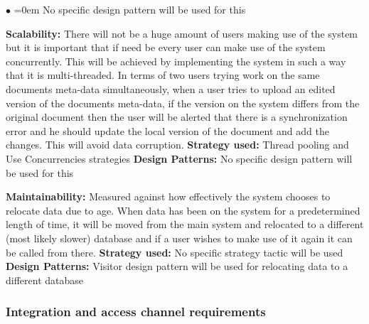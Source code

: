 \documentclass[english]{article}
\begin{document}
\begin{list}{$\bullet$}{\leftmargin=1.5cm \itemindent=0em}
					\newline No specific design pattern will be used for this				
					\item \textbf{Scalability:} There will not be a huge amount of users making use of the system but it is important that if need be every user can make use of the system concurrently. This will be achieved by implementing the system in such a way that it is multi-threaded. In terms of two users trying work on the same documents meta-data simultaneously, when a user tries to upload an edited version of the documents meta-data, if the version on the system differs from the original document then the user will be alerted that there is a synchronization error and he should update the local version of the document and add the changes. This will avoid data corruption.
					\newline \textbf{Strategy used:}
					\newline Thread pooling and Use Concurrencies strategies
					\newline \textbf{Design Patterns:}
					\newline No specific design pattern will be used for this
					\item \textbf{Maintainability:} Measured against how effectively the system chooses to relocate data due to age. When data has been on the system for a predetermined length of time, it will be moved from the main system and relocated to a different (most likely slower) database and if a user wishes to make use of it again it can be called from there.
					\newline \textbf{Strategy used:}
					\newline No specific strategy tactic will be used
					\newline \textbf{Design Patterns:}
					\newline Visitor design pattern will be used for relocating data to a different database
				\end{list}
			
			\subsubsection{Integration and access channel requirements}
\end{document}
